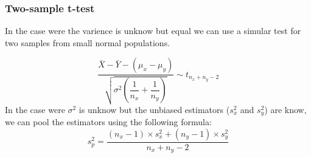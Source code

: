     
        \subsubsection{Two-sample t-test}
            In the case were the varience is unknow but equal we can use a simular test for two samples from small normal populations.

            $$
            \frac{\bar{X} - \bar{Y} - (\mu_x - \mu_y)}{\sqrt{\sigma^2\left(\dfrac{1}{n_x} + \dfrac{1}{n_y}\right)}}
            \sim t_{n_x+n_y-2}
            $$
            In the case were $\sigma^2$ is unknow but the unbiased estimators ($s_x^2$ and $s_y^2$) are know, we can pool the estimators using the following formula:
            $$
            s_p^2 = \frac{(n_x-1)\times s_x^2 + (n_y-1) \times s_y^2}{n_x + n_y - 2}
            $$ 

